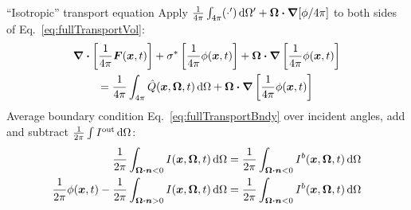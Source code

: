 \documentclass[draft]{beamer}
\begin{document}
\begin{frame}{``Isotropic'' transport equation}
Apply $ \frac{1}{4\pi} \int_{4\pi} (\cdot') \mathop{}\!\mathrm{d} \Omega' + \bm{\Omega}\bm{\cdot} \bm{\nabla}
[\phi/4\pi]$ to both sides of Eq.~\eqref{eq:fullTransportVol}:
\begin{multline*}
  \bm{\nabla} \bm{\cdot} \left[ \frac1{4\pi} \bm{F}(\bm{x}, t) \right]
  + \sigma^\ast \left[ \frac1{4\pi} \phi(\bm{x}, t) \right]
  + \bm{\Omega}\bm{\cdot} \bm{\nabla}  \left[ \frac1{4\pi} \phi(\bm{x}, t) \right]
  \\
  =
  \frac{1}{4\pi} \int_{4\pi} \hat Q(\bm{x}, \bm{\Omega}, t) \mathop{}\!\mathrm{d} \Omega
  + \bm{\Omega}\bm{\cdot} \bm{\nabla}  \left[ \frac1{4\pi} \phi(\bm{x}, t) \right]
\end{multline*}
Average boundary condition Eq.~\eqref{eq:fullTransportBndy} over incident
angles, add and subtract $\frac{1}{2\pi} \int I^\mathrm{out} \mathop{}\!\mathrm{d} \Omega$:
\begin{align} \nonumber
 \frac{1}{2\pi} \int_{\bm{\Omega} \bm{\cdot} \bm{n} < 0} I(\bm{x}, \bm{\Omega},
 t) \mathop{}\!\mathrm{d} \Omega
 &= \frac{1}{2\pi} \int_{\bm{\Omega} \bm{\cdot} \bm{n} < 0}I^b(\bm{x},
 \bm{\Omega}, t) \mathop{}\!\mathrm{d} \Omega
\\ 
\label{eq:fullIsotropicTransportBndy}
 \frac{1}{2\pi} \phi(\bm{x}, t)
 - \frac{1}{2\pi} \int_{\bm{\Omega} \bm{\cdot} \bm{n} > 0}
 I(\bm{x}, \bm{\Omega}, t) \mathop{}\!\mathrm{d} \Omega
 &= \frac{1}{2\pi} \int_{\bm{\Omega} \bm{\cdot} \bm{n} < 0}
 I^b(\bm{x}, \bm{\Omega}, t) \mathop{}\!\mathrm{d} \Omega
\end{align}
\end{frame}
\end{document}
